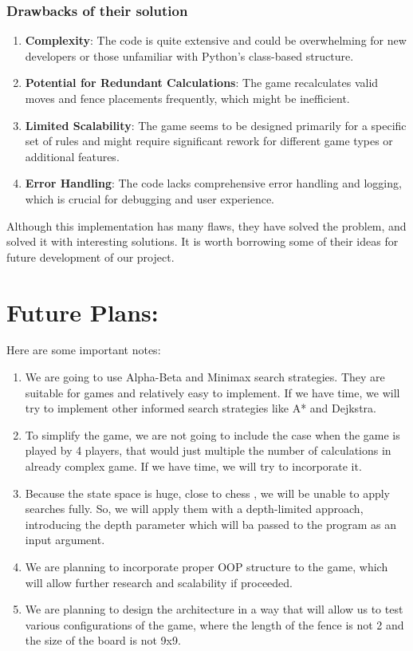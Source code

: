 \documentclass{article}
\begin{document}
\subsubsection{Drawbacks of their solution}
\begin{enumerate}
	\item \textbf{Complexity}: The code is quite extensive and could be overwhelming for new developers or those unfamiliar with Python's class-based structure.
	\item \textbf{Potential for Redundant Calculations}: The game recalculates valid moves and fence placements frequently, which might be inefficient.
	\item \textbf{Limited Scalability}: The game seems to be designed primarily for a specific set of rules and might require significant rework for different game types or additional features.
	\item \textbf{Error Handling}: The code lacks comprehensive error handling and logging, which is crucial for debugging and user experience.

\end{enumerate}
Although this implementation has many flaws, they have solved the problem, and solved it with interesting solutions. It is worth borrowing some of their ideas for future development of our project. 

\section{Future Plans:}

Here are some important notes:
\begin{enumerate}
	\item We are going to use Alpha-Beta and Minimax search strategies. They are suitable for games and relatively easy to implement. If we have time, we will try to implement other informed search strategies like A* and Dejkstra.
	
	\item To simplify the game, we are not going to include the case when the game is played by 4 players, that would just multiple the number of calculations in already complex game. If we have time, we will try to incorporate it.

	\item Because the state space is huge, close to chess \cite{ai_agent}, we will be unable to apply searches fully. So, we will apply them with a depth-limited approach, introducing the depth parameter which will ba passed to the program as an input argument.
	
	\item We are planning to incorporate proper OOP structure to the game, which will allow further research and scalability if proceeded. 

	\item We are planning to design the architecture in a way that will allow us to test various configurations of the game, where the length of the fence is not 2 and the size of the board is not 9x9. 
\end{enumerate}

\printbibliography
\end{document}

